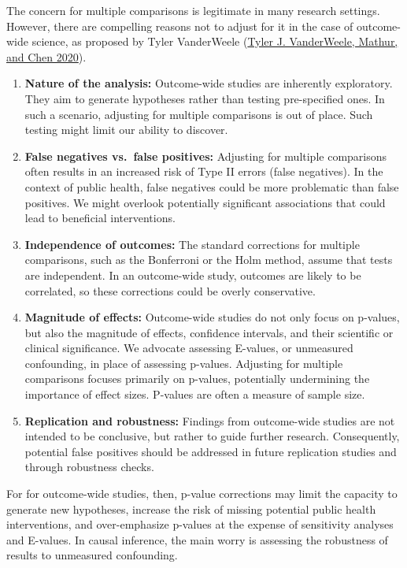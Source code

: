 \documentclass[
  singlecolumn]{report}
\begin{document}
The concern for multiple comparisons is legitimate in many research
settings. However, there are compelling reasons not to adjust for it in
the case of outcome-wide science, as proposed by Tyler VanderWeele
(\protect\hyperlink{ref-vanderweele2020}{Tyler J. VanderWeele, Mathur,
and Chen 2020}).

\begin{enumerate}
\def\labelenumi{\arabic{enumi}.}
\item
  \textbf{Nature of the analysis:} Outcome-wide studies are inherently
  exploratory. They aim to generate hypotheses rather than testing
  pre-specified ones. In such a scenario, adjusting for multiple
  comparisons is out of place. Such testing might limit our ability to
  discover.
\item
  \textbf{False negatives vs.~false positives:} Adjusting for multiple
  comparisons often results in an increased risk of Type II errors
  (false negatives). In the context of public health, false negatives
  could be more problematic than false positives. We might overlook
  potentially significant associations that could lead to beneficial
  interventions.
\item
  \textbf{Independence of outcomes:} The standard corrections for
  multiple comparisons, such as the Bonferroni or the Holm method,
  assume that tests are independent. In an outcome-wide study, outcomes
  are likely to be correlated, so these corrections could be overly
  conservative.
\item
  \textbf{Magnitude of effects:} Outcome-wide studies do not only focus
  on p-values, but also the magnitude of effects, confidence intervals,
  and their scientific or clinical significance. We advocate assessing
  E-values, or unmeasured confounding, in place of assessing p-values.
  Adjusting for multiple comparisons focuses primarily on p-values,
  potentially undermining the importance of effect sizes. P-values are
  often a measure of sample size.
\item
  \textbf{Replication and robustness:} Findings from outcome-wide
  studies are not intended to be conclusive, but rather to guide further
  research. Consequently, potential false positives should be addressed
  in future replication studies and through robustness checks.
\end{enumerate}

For for outcome-wide studies, then, p-value corrections may limit the
capacity to generate new hypotheses, increase the risk of missing
potential public health interventions, and over-emphasize p-values at
the expense of sensitivity analyses and E-values. In causal inference,
the main worry is assessing the robustness of results to unmeasured
confounding.
\end{document}
